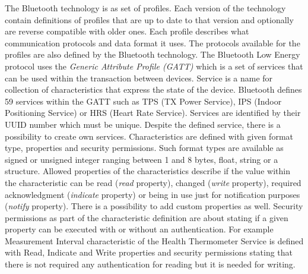 \documentclass[../main.tex]{subfiles}
\begin{document}
The Bluetooth technology is as set of profiles. Each version of the technology contain definitions of profiles that are up to date to that version and optionally are reverse compatible with older ones. Each profile describes what communication protocols and data format it uses. The protocols available for the profiles are also defined by the Bluetooth technology. The Bluetooth Low Energy protocol uses the \textit{Generic Attribute Profile (GATT)} which is a set of services that can be used within the transaction between devices. Service is a name for collection of characteristics that express the state of the device. Bluetooth defines 59 services within the GATT such as TPS (TX Power Service), IPS (Indoor Positioning Service) or HRS (Heart Rate Service). Services are identified by their UUID number which must be unique. Despite the defined service, there is a possibility to create own services. Characteristics are defined with given format type, properties and security permissions. Such format types are available as signed or unsigned integer ranging between 1 and 8 bytes, float, string or a structure. Allowed properties of the characteristics describe if the value within the characteristic can be read (\textit{read} property), changed (\textit{write} property), required acknowledgment (\textit{indicate} property) or being in use just for notification purposes (\textit{notify} property). There is a possibility to add custom properties as well. Security permissions as part of the characteristic definition are about stating if a given property can be executed with or without an authentication. For example Measurement Interval characteristic of the Health Thermometer Service is defined with Read, Indicate and Write properties and security permissions stating that there is not required any authentication for reading but it is needed for writing.
\end{document}
